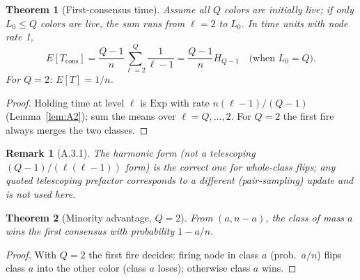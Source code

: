 \documentclass[preprint,12pt]{elsarticle}
\newtheorem{theorem}{Theorem}[section]
\newtheorem{remark}{Remark}[theorem]
\begin{document}
\begin{theorem}[First-consensus time]
\label{thm:A3}
Assume all $Q$ colors are initially live; if only $L_0\le Q$ colors are
live, the sum runs from $\ell=2$ to $L_0$. In time units with node rate 1,
\[
E[T_{\mathrm{cons}}]=\frac{Q-1}{n}\sum_{\ell=2}^{Q}\frac{1}{\ell-1}
=\frac{Q-1}{n}H_{Q-1}\quad\text{(when $L_0=Q$)}.
\]
For $Q=2$: $E[T]=1/n$.
\end{theorem}
\begin{proof}
Holding time at level $\ell$ is $\mathrm{Exp}$ with rate
$n(\ell-1)/(Q-1)$ (Lemma~\ref{lem:A2}); sum the means over
$\ell=Q,\dots,2$. For $Q=2$ the first fire always merges the two classes.
\end{proof}
\begin{remark}[A.3.1]
\label{rem:A3.1}
The harmonic form (not a telescoping $(Q-1)/(\ell(\ell-1))$ form) is the
correct one for whole-class flips; any quoted telescoping prefactor
corresponds to a different (pair-sampling) update and is not used here.
\end{remark}

\begin{theorem}[Minority advantage, $Q=2$]
\label{thm:A4}
From $(a,n-a)$, the class of mass $a$ wins the first consensus with
probability $1-a/n$.
\end{theorem}
\begin{proof}
With $Q=2$ the first fire decides: firing node in class $a$
(prob.\ $a/n$) flips class $a$ into the other color (class $a$ loses);
otherwise class $a$ wins.
\end{proof}
\end{document}

